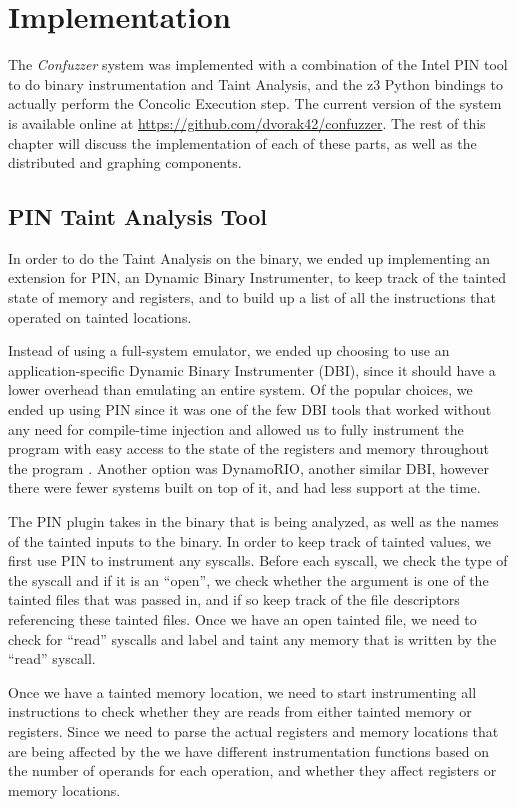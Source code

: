 \chapter{Implementation}
The \textit{Confuzzer} system was implemented with a combination of the Intel
PIN tool to do binary instrumentation and Taint Analysis, and the z3 Python
bindings to actually perform the Concolic Execution step. The current version of
the system is available online at \url{https://github.com/dvorak42/confuzzer}.
The rest of this chapter will discuss the implementation of each of these parts,
as well as the distributed and graphing components.

\section{PIN Taint Analysis Tool}
In order to do the Taint Analysis on the binary, we ended up implementing an
extension for PIN, an Dynamic Binary Instrumenter, to keep track of the tainted
state of memory and registers, and to build up a list of all the instructions
that operated on tainted locations. 

Instead of using a full-system emulator, we ended up choosing to use
an application-specific Dynamic Binary Instrumenter (DBI), since it should have
a lower overhead than emulating an entire system. Of the popular choices, we
ended up using PIN since it was one of the few DBI tools that worked without any
need for compile-time injection and allowed us to fully instrument the program
with easy access to the state of the registers and memory throughout the
program \cite{pintool}. Another option was DynamoRIO, another similar DBI,
however there were fewer systems built on top of it, and had less support at the
time.

The PIN plugin takes in the binary that is being analyzed, as well as the names
of the tainted inputs to the binary. In order to keep track of tainted values,
we first use PIN to instrument any syscalls. Before each syscall, we check the
type of the syscall and if it is an ``open'', we check whether the argument is
one of the tainted files that was passed in, and if so keep track of the file
descriptors referencing these tainted files. Once we have an open tainted file,
we need to check for ``read'' syscalls and label and taint any memory that is
written by the ``read'' syscall.

Once we have a tainted memory location, we need to start instrumenting all
instructions to check whether they are reads from either tainted memory or
registers. Since we need to parse the actual registers and memory locations that
are being affected by the we have different instrumentation functions based on
the number of operands for each operation, and whether they affect registers or
memory locations.

